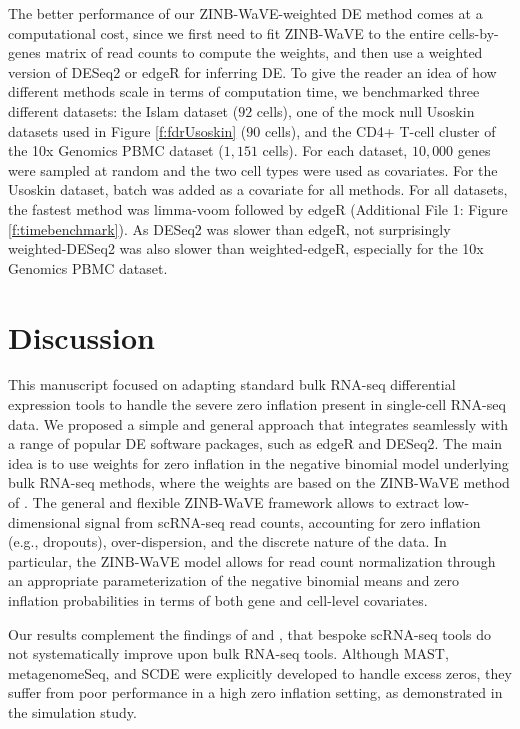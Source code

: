 \documentclass{bmcart}
\newcommand{\RPack}[1]{\textsf{#1}}
\begin{document}
The better performance of our ZINB-WaVE-weighted DE method comes at a computational cost, since we first need to fit ZINB-WaVE to the entire cells-by-genes matrix of read counts to compute the weights, and then use a weighted version of \RPack{DESeq2} or \RPack{edgeR} for inferring DE. To give the reader an idea of how different methods scale in terms of computation time, we benchmarked three different datasets: the Islam dataset ($92$ cells), one of the mock null Usoskin datasets used in Figure \ref{f:fdrUsoskin} ($90$ cells), and the CD4+ T-cell cluster of the 10x Genomics PBMC dataset ($1,151$ cells). For each dataset, $10,000$ genes were sampled at random and the two cell types were used as covariates. For the Usoskin dataset, batch was added as a covariate for all methods. For all datasets, the fastest method was limma-voom followed by \RPack{edgeR} (Additional File 1: Figure \ref{f:timebenchmark}). As \RPack{DESeq2} was slower than \RPack{edgeR}, not surprisingly weighted-DESeq2 was also slower than weighted-edgeR, especially for the 10x Genomics PBMC dataset.


\section*{Discussion}

This manuscript focused on adapting standard bulk RNA-seq differential expression tools to handle the severe zero inflation present in single-cell RNA-seq data. We proposed a simple and general approach that integrates seamlessly with a range of popular DE software packages, such as \RPack{edgeR} and \RPack{DESeq2}. The main idea is to use weights for zero inflation in the negative binomial model underlying bulk RNA-seq methods, where the weights are based on the ZINB-WaVE method of \citet{Risso2017}. The general and flexible ZINB-WaVE framework allows to extract low-dimensional signal from scRNA-seq read counts, accounting for zero inflation (e.g., dropouts), over-dispersion, and the discrete nature of the data. In particular, the ZINB-WaVE model allows for read count normalization through an appropriate parameterization of the negative binomial means and zero inflation probabilities in terms of both gene and cell-level covariates. 

Our results complement the findings of \citet{Jaakkola2016} and \citet{Soneson2017}, that bespoke scRNA-seq tools do not systematically improve upon bulk RNA-seq tools. Although \RPack{MAST}, \RPack{metagenomeSeq}, and \RPack{SCDE} were explicitly developed to handle excess zeros, they suffer from poor performance in a high zero inflation setting, as demonstrated in the simulation study. 
\end{document}
